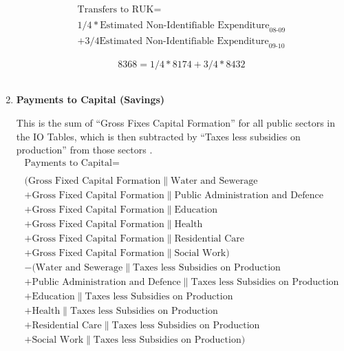 \begin{enumerate}
\begin{equation}
\begin{split}
\text{Transfers to RUK} =  \\ \\
1/4*\text{Estimated Non-Identifiable Expenditure}_\text{08-09}\\
+3/4\text{Estimated Non-Identifiable Expenditure}_\text{09-10}
\end{split} \label{eq:2.5.45}
\end{equation}

\begin{equation} \nonumber
8368 = 1/4*8174+3/4*8432
\end{equation}\\


\item \textbf {Payments to Capital (Savings)}

This is the sum of ``Gross Fixes Capital Formation'' for all public sectors in the IO Tables, which is then subtracted by ``Taxes less subsidies on production'' from those sectors \cite{ScotGov2013a}.\\

\begin{equation}
\begin{split}
\text{Payments to Capital} =  \\ \\
(\text{Gross Fixed Capital Formation}\|\text{Water and Sewerage}\\
+\text{Gross Fixed Capital Formation}\|\text{Public Administration and Defence}\\
+\text{Gross Fixed Capital Formation}\|\text{Education}\\
+\text{Gross Fixed Capital Formation}\|\text{Health}\\
+\text{Gross Fixed Capital Formation}\|\text{Residential Care}\\
+\text{Gross Fixed Capital Formation}\|\text{Social Work})\\
-(\text{Water and Sewerage}\|\text{Taxes less Subsidies on Production}\\
+\text{Public Administration and Defence}\|\text{Taxes less Subsidies on Production}\\
+\text{Education}\|\text{Taxes less Subsidies on Production}\\
+\text{Health}\|\text{Taxes less Subsidies on Production}\\
+\text{Residential Care}\|\text{Taxes less Subsidies on Production}\\
+\text{Social Work}\|\text{Taxes less Subsidies on Production})
\end{split} \label{eq:2.5.46}
\end{equation}


\end{enumerate}
